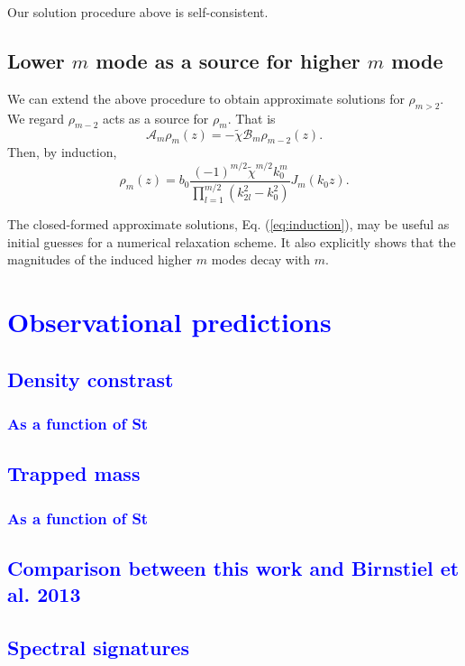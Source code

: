 \documentclass[apj]{emulateapj}
\def\blue#1{\textcolor{blue}{#1}}
\newcommand{\Eq}[1]{Eq. (\ref{#1})}
\newcommand{\eq}[1]{\Eq{#1}}
\newcommand{\beq}{\begin{equation}}
\newcommand{\eeq}{\end{equation}}
\begin{document}
Our solution procedure above is self-consistent.  


\subsection{Lower $m$ mode as a source for higher $m$ mode}
We can extend the above procedure to obtain approximate solutions for
$\rho_{m>2}$. We regard $\rho_{m-2}$ acts as a source for $\rho_{m}$. That is
\beq\label{eq:higherm}
\mathcal{A}_m\rho_m(z) = -\tilde{\chi}\mathcal{B}_m\rho_{m-2}(z). 
\eeq 
Then, by induction,
\beq\label{eq:induction}
\rho_m(z) =b_0
\frac{(-1)^{m/2}\tilde{\chi}^{m/2}k_0^m}{\prod_{l=1}^{m/2}(k_{2l}^2-k_0^2)}J_m(k_0z). 
\eeq

The closed-formed approximate solutions, \eq{eq:induction}, may be useful as initial
guesses for a numerical relaxation scheme. It also explicitly shows that the
magnitudes of the induced higher $m$ modes decay with $m$.  

\section{\blue{Observational predictions}}

\subsection{\blue{Density constrast}}
\subsubsection{\blue{As a function of St}}

\subsection{\blue{Trapped mass}}
\subsubsection{\blue{As a function of St}}

\subsection{\blue{Comparison between this work and Birnstiel et
    al. 2013}}

\subsection{\blue{Spectral signatures}}
\end{document}
